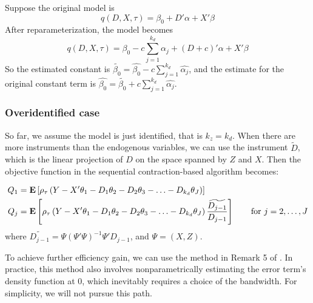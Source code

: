 Suppose the original model is 
$$
	q(D, X, \tau) = \beta_0 + D'\alpha + X'\beta 
$$
After reparameterization, the model becomes
$$
	q(D, X, \tau) = \beta_0 - c \sum_{j=1}^{k_d}\alpha_j 
		+ (D + c)'\alpha + X'\beta 
$$
So the estimated constant is 
$\tilde{\beta_0} = \hat{\beta_0} - c \sum_{j=1}^{k_d}\hat{\alpha_j}$, 
and the estimate for the original constant term
is $ \hat{\beta_0} = \tilde{\beta_0} + c\sum_{j=1}^{k_d}\hat{\alpha_j}$.


\subsubsection{Overidentified case}	
So far, we assume the model is just identified, that is $k_z = k_d$. When there
are more instruments than the endogenous variables, we can use the instrument
$\tilde{D}$, which is the linear projection of $D$ on the space spanned by $Z$
and $X$. Then the objective function in the sequential contraction-based
algorithm becomes:

\begin{align*}
Q_1 &= \mathbf{E}\left[ \rho_{\tau} \left(Y - X'\theta_1 - 	
	D_1\theta_2 - D_2\theta_3 - \ldots - D_{k_d}\theta_J \right) \right] \\
Q_j &= \mathbf{E}\left[ \rho_{\tau} 
\left(
Y - X'\theta_1 - D_1\theta_2 - D_2\theta_3 - \ldots - D_{k_d}\theta_J 
\right) 
	\frac{\widetilde{D_{j-1}}}{D_{j-1}}
	\right] \qquad \text{for } j=2, \ldots, J 
\end{align*}
where $\widetilde{D_{j-1}} = \Psi(\Psi'\Psi)^{-1}\Psi'D_{j-1}$, and $\Psi = (X,
Z)$.

To achieve further efficiency gain, we can use the method in Remark 5 of
\cite{Chernozhukov2006}. In practice, this method also involves
nonparametrically estimating the error term's density function at $0$, which
inevitably requires a choice of the bandwidth. For simplicity, we will not
pursue this path.
